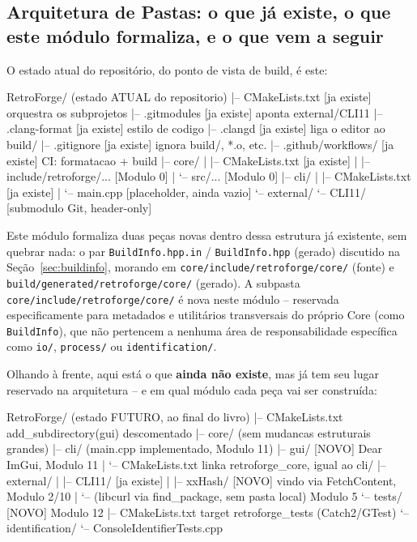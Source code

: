 \subsection{Arquitetura de Pastas: o que já existe, o que este módulo formaliza, e o que vem a seguir}

O estado atual do repositório, do ponto de vista de build, é este:

\begin{CaixaArvore}
RetroForge/                          (estado ATUAL do repositorio)
|-- CMakeLists.txt                   [ja existe]  orquestra os subprojetos
|-- .gitmodules                      [ja existe]  aponta external/CLI11
|-- .clang-format                    [ja existe]  estilo de codigo
|-- .clangd                          [ja existe]  liga o editor ao build/
|-- .gitignore                       [ja existe]  ignora build/, *.o, etc.
|-- .github/workflows/               [ja existe]  CI: formatacao + build
|-- core/
|   |-- CMakeLists.txt               [ja existe]
|   |-- include/retroforge/...       [Modulo 0]
|   `-- src/...                      [Modulo 0]
|-- cli/
|   |-- CMakeLists.txt               [ja existe]
|   `-- main.cpp                     [placeholder, ainda vazio]
`-- external/
    `-- CLI11/                      [submodulo Git, header-only]
\end{CaixaArvore}

Este módulo formaliza duas peças novas dentro dessa estrutura já existente, sem quebrar nada: o par \texttt{BuildInfo.hpp.in} / \texttt{BuildInfo.hpp} (gerado) discutido na Seção~\ref{sec:buildinfo}, morando em \texttt{core/include/retroforge/core/} (fonte) e \texttt{build/generated/retroforge/core/} (gerado). A subpasta \texttt{core/include/retroforge/core/} é nova neste módulo -- reservada especificamente para metadados e utilitários transversais do próprio Core (como \texttt{BuildInfo}), que não pertencem a nenhuma área de responsabilidade específica como \texttt{io/}, \texttt{process/} ou \texttt{identification/}.

Olhando à frente, aqui está o que \textbf{ainda não existe}, mas já tem seu lugar reservado na arquitetura -- e em qual módulo cada peça vai ser construída:

\begin{CaixaArvore}
RetroForge/                          (estado FUTURO, ao final do livro)
|-- CMakeLists.txt                    add_subdirectory(gui) descomentado
|-- core/                             (sem mudancas estruturais grandes)
|-- cli/                              (main.cpp implementado, Modulo 11)
|-- gui/                       [NOVO] Dear ImGui, Modulo 11
|   `-- CMakeLists.txt                linka retroforge_core, igual ao cli/
|-- external/
|   |-- CLI11/                        [ja existe]
|   |-- xxHash/                [NOVO] vindo via FetchContent, Modulo 2/10
|   `-- (libcurl via find_package, sem pasta local)   Modulo 5
`-- tests/                     [NOVO] Modulo 12
    |-- CMakeLists.txt                 target retroforge_tests (Catch2/GTest)
    `-- identification/
        `-- ConsoleIdentifierTests.cpp
\end{CaixaArvore}

